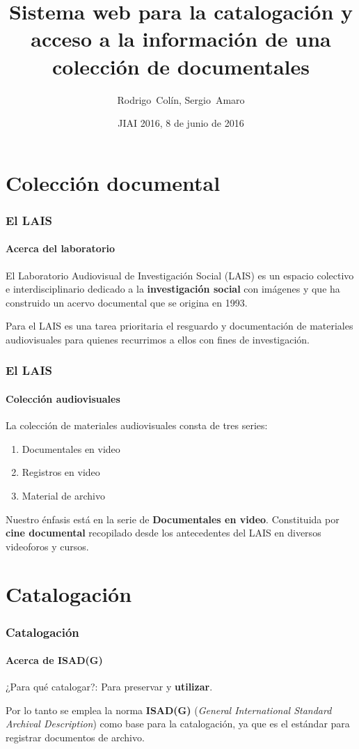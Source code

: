 \documentclass{beamer}
\title[Sistema web metaDOC]
{Sistema web para la catalogación y acceso a la información de una colección de documentales}
\subtitle{}
\author{Rodrigo~Colín\inst{1}, Sergio~Amaro\inst{2}}
\institute
{
	\inst{1}
	Laboratorio Audiovisual de Investigación Social\\
	Instituto Mora
	\and
	\inst{2}
	Facultad de Ciencias\\
	Universidad Nacional Autónoma de México
}
\date{JIAI 2016, 8 de junio de 2016}
\begin{document}
\frame{\titlepage} %

\section{Colección documental}
\begin{frame}
	\frametitle{El LAIS}
	\framesubtitle{Acerca del laboratorio}
	
	El Laboratorio Audiovisual de Investigación Social (LAIS) es un espacio colectivo e interdisciplinario dedicado a la \textbf{investigación social} con imágenes y que ha construido un acervo documental que se origina en 1993.

	Para el LAIS es una tarea prioritaria el resguardo y documentación de materiales audiovisuales para quienes recurrimos a ellos con fines de investigación.
	
\end{frame}


\begin{frame}
	\frametitle{El LAIS}
	\framesubtitle{Colección audiovisuales}
	
	La colección de materiales audiovisuales consta de tres series:
	\begin{enumerate}
		\item Documentales en video
		\item Registros en video
		\item Material de archivo
	\end{enumerate} \pause
	
	Nuestro énfasis está en la serie de \textbf{Documentales en video}. Constituida por \textbf{cine documental} recopilado desde los antecedentes del LAIS en diversos videoforos y cursos.
	
\end{frame}


\section{Catalogación}
\begin{frame}
	\frametitle{Catalogación}
	\framesubtitle{Acerca de ISAD(G)}
	
	¿Para qué catalogar?: Para preservar y \textbf{utilizar}.
	
	Por lo tanto se emplea la norma \textbf{ISAD(G)} (\textit{General International Standard Archival Description}) como base para la catalogación, ya que es el estándar para registrar documentos de archivo.
\end{frame}
\end{document}
